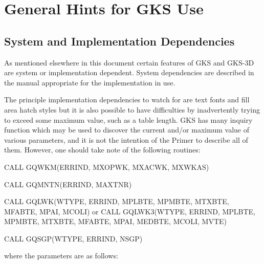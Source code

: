 \chapter{\protect\label{sec:refhint}General Hints for GKS Use}
\section{System and Implementation Dependencies}
 
As mentioned elsewhere in this document certain features of GKS and GKS-3D
are system or implementation dependent. System dependencies are described
in the manual appropriate for the implementation in use.
 
The principle implementation dependencies to watch for are text fonts and
fill area hatch styles
but it is also possible to have difficulties by inadvertently trying to
exceed some maximum value, such as a table length.
GKS has many inquiry function which may be used to discover the current
and/or maximum value of various parameters,
and it is not the intention of the Primer to describe all of them.
However, one should take note of the following routines:
\begin{XMP}
CALL GQWKM(ERRIND, MXOPWK, MXACWK, MXWKAS)
 
CALL GQMNTN(ERRIND, MAXTNR)
 
CALL GQLWK(WTYPE, ERRIND, MPLBTE, MPMBTE, MTXBTE, MFABTE, MPAI, MCOLI)
    or
CALL GQLWK3(WTYPE, ERRIND, MPLBTE, MPMBTE, MTXBTE, MFABTE, MPAI,
             MEDBTE, MCOLI, MVTE)
 
CALL GQSGP(WTYPE, ERRIND, NSGP)
\end{XMP}
where the parameters are as follows:
